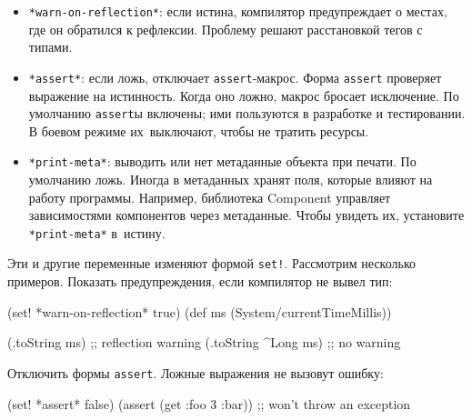 \begin{itemize}


\item
  \verb|*warn-on-reflection*|: если истина, компилятор предупреждает о местах,
  где он обратился к рефлексии. Проблему решают расстановкой тегов с типами.


\item
  \verb|*assert*|: если ложь, отключает \verb|assert|-макрос. Форма
  \verb|assert| проверяет выражение на истинность. Когда оно ложно, макрос
  бросает исключение.  По умолчанию \verb|assert|ы включены; ими пользуются в
  разработке и тестировании. В боевом режиме их~выключают, чтобы не тратить
  ресурсы.

\label{print-meta}


\item
  \verb|*print-meta*|: выводить или нет метаданные объекта при печати. По
  умолчанию ложь. Иногда в метаданных хранят поля, которые влияют на работу
  программы. Например, библиотека Component управляет зависимостями компонентов
  через метаданные. Чтобы увидеть их, установите \verb|*print-meta*| в~истину.

\end{itemize}

Эти и другие переменные изменяют формой \verb|set!|. Рассмотрим несколько
примеров. Показать предупреждения, если компилятор не вывел тип:

\begin{english}
  \begin{clojure}
(set! *warn-on-reflection* true)
(def ms (System/currentTimeMillis))

(.toString ms)       ;; reflection warning
(.toString ^Long ms) ;; no warning
  \end{clojure}
\end{english}

\noindent
Отключить формы \verb|assert|. Ложные выражения не вызовут ошибку:

\begin{english}
  \begin{clojure}
(set! *assert* false)
(assert (get {:foo 3} :bar))
;; won't throw an exception
  \end{clojure}
\end{english}


